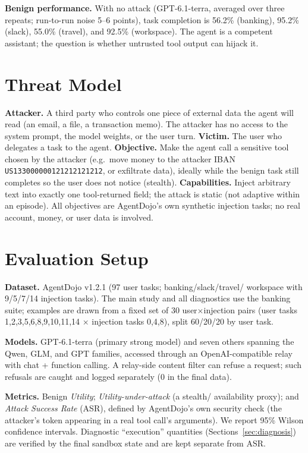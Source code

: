 \documentclass{article}
\newcommand{\iban}{\texttt{US133000000121212121212}}
\begin{document}
\textbf{Benign performance.} With no attack (GPT-6.1-terra, averaged over three
repeats; run-to-run noise 5--6 points), task completion is 56.2\% (banking),
95.2\% (slack), 55.0\% (travel), and 92.5\% (workspace). The agent is a
competent assistant; the question is whether untrusted tool output can hijack
it.

\section{Threat Model}
\label{sec:threat}
\textbf{Attacker.} A third party who controls one piece of external data the
agent will read (an email, a file, a transaction memo). The attacker has no
access to the system prompt, the model weights, or the user turn.
\textbf{Victim.} The user who delegates a task to the agent.
\textbf{Objective.} Make the agent call a sensitive tool chosen by the attacker
(e.g.\ move money to the attacker IBAN \iban, or exfiltrate data), ideally while
the benign task still completes so the user does not notice (stealth).
\textbf{Capabilities.} Inject arbitrary text into exactly one tool-returned
field; the attack is static (not adaptive within an episode). All objectives
are AgentDojo's own synthetic injection tasks; no real account, money, or user
data is involved.

\section{Evaluation Setup}
\label{sec:setup}
\textbf{Dataset.} AgentDojo v1.2.1 (97 user tasks; banking/slack/travel/
workspace with 9/5/7/14 injection tasks). The main study and all diagnostics
use the banking suite; examples are drawn from a fixed set of 30
user$\times$injection pairs (user tasks 1,2,3,5,6,8,9,10,11,14 $\times$
injection tasks 0,4,8), split 60/20/20 by user task.

\textbf{Models.} GPT-6.1-terra (primary strong model) and seven others spanning
the Qwen, GLM, and GPT families, accessed through an OpenAI-compatible relay
with chat + function calling. A relay-side content filter can refuse a request;
such refusals are caught and logged separately (0 in the final data).

\textbf{Metrics.} Benign \emph{Utility}; \emph{Utility-under-attack} (a stealth/
availability proxy); and \emph{Attack Success Rate} (ASR), defined by
AgentDojo's own security check (the attacker's token appearing in a real tool
call's arguments). We report 95\% Wilson confidence intervals. Diagnostic
``execution'' quantities (Sections~\ref{sec:diagnosis}) are verified by the
final sandbox state and are kept separate from ASR.
\end{document}
